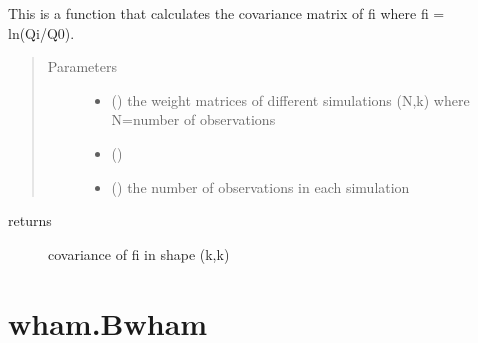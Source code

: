 \documentclass[letterpaper,10pt,english]{sphinxmanual}
\begin{document}
\begin{fulllineitems}
\label{\detokenize{wham.lib:wham.lib.wham_utils.cov_fi}}
This is a function that calculates the covariance matrix of fi where
fi = \sphinxhyphen{}ln(Qi/Q0).
\begin{quote}\begin{description}
\item[{Parameters}] \leavevmode\begin{itemize}
\item {} 
 () \textendash{} the weight matrices of different simulations (N,k) where N=number of observations

\item {} 
\sphinxstyleliteralstrong{\sphinxupquote{, }} () \textendash{} 

\item {} 
 () \textendash{} the number of observations in each simulation

\end{itemize}

\end{description}\end{quote}
\begin{description}
\item[{returns}] \leavevmode
covariance of fi in shape (k,k)

\end{description}

\end{fulllineitems}



\section{wham.Bwham}
\label{\detokenize{wham:module-wham.Bwham}}\label{\detokenize{wham:wham-bwham}}
\end{document}
